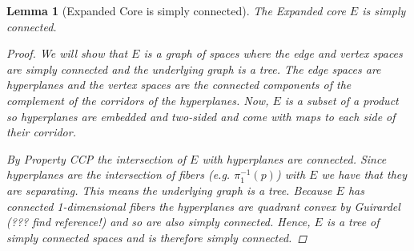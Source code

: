 \documentclass[12pt,parskip=full]{report}
\theoremstyle{plain}
\newtheorem{lem}[thm]{Lemma}
\theoremstyle{definition}
\begin{document}
\begin{lem}
    [Expanded Core is simply connected]
    \label{lem:coresc} 
    The Expanded core $E$ is simply connected.
    
    \begin{proof}
    
        
    
        We will show that $E$ is a graph of spaces where the edge and vertex spaces are simply connected and the underlying graph is a tree. The edge spaces are hyperplanes and the vertex spaces are the connected components of the complement of the corridors of the hyperplanes. Now, $E$ is a subset of a product so hyperplanes are embedded and two-sided and come with maps to each side of their corridor. 
        
        By Property CCP the intersection of $E$ with hyperplanes are connected. Since hyperplanes are the intersection of fibers (e.g. $\pi_1^{-1}(p)$) with $E$ we have that they are separating. This means the underlying graph is a tree. Because $E$ has connected 1-dimensional fibers the hyperplanes are quadrant convex by Guirardel (??? find reference!) and so are also simply connected. Hence, $E$ is a tree of simply connected spaces and is therefore simply connected.
        
        



        

\end{proof}
\end{lem}
\end{document}
